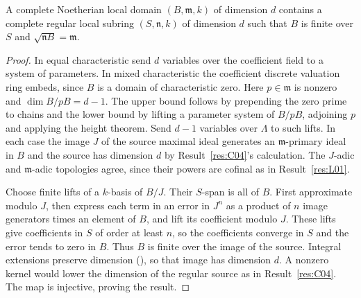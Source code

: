 \begin{theorem}\label{res:C05}
A complete Noetherian local domain \((B,\mathfrak m,k)\) of
dimension \(d\) contains a complete regular local subring
\((S,\mathfrak n,k)\) of dimension \(d\) such that \(B\) is finite
over \(S\) and \(\sqrt{\mathfrak n B}=\mathfrak m\).
\end{theorem}
\begin{proof}
In equal characteristic send \(d\) variables over the coefficient
field to a system of parameters. In mixed characteristic the
coefficient discrete valuation ring embeds, since \(B\) is a
domain of characteristic zero. Here \(p\in\mathfrak m\) is
nonzero and \(\dim B/pB=d-1\). The upper bound follows by
prepending the zero prime to chains and the lower bound by
lifting a parameter system of \(B/pB\), adjoining \(p\) and applying
the height theorem. Send \(d-1\) variables over \(\Lambda\) to such
lifts. In each case the image \(J\) of the source maximal ideal
generates an \(\mathfrak m\)-primary ideal in \(B\) and the source
has dimension \(d\) by Result~\ref{res:C04}'s calculation.
The \(J\)-adic and \(\mathfrak m\)-adic topologies agree, since their
powers are cofinal as in Result~\ref{res:L01}.

Choose finite lifts of a \(k\)-basis of \(B/J\).
Their \(S\)-span is all of \(B\). First approximate modulo \(J\),
then express each term in an error in \(J^n\) as a product of
\(n\) image generators times an element of \(B\), and lift its
coefficient modulo \(J\). These lifts give coefficients in \(S\)
of order at least \(n\), so the coefficients converge in \(S\) and
the error tends to zero in \(B\). Thus \(B\) is finite over the
image of the source. Integral extensions preserve dimension
(\cite[ALG-05-C01-S04]{p103}), so that image has dimension \(d\).
A nonzero kernel would lower the dimension of the regular source
as in Result~\ref{res:C04}. The map is injective, proving the result.
\end{proof}
